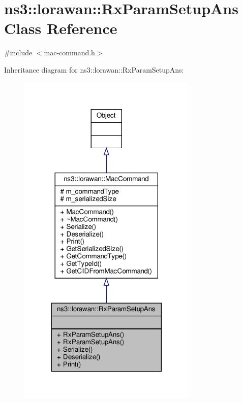 \hypertarget{classns3_1_1lorawan_1_1RxParamSetupAns}{}\section{ns3\+:\+:lorawan\+:\+:Rx\+Param\+Setup\+Ans Class Reference}
\label{classns3_1_1lorawan_1_1RxParamSetupAns}


{\ttfamily \#include $<$mac-\/command.\+h$>$}



Inheritance diagram for ns3\+:\+:lorawan\+:\+:Rx\+Param\+Setup\+Ans\+:
\nopagebreak
\begin{figure}[H]
\begin{center}
\leavevmode
\includegraphics[width=242pt]{classns3_1_1lorawan_1_1RxParamSetupAns__inherit__graph}
\end{center}
\end{figure}


